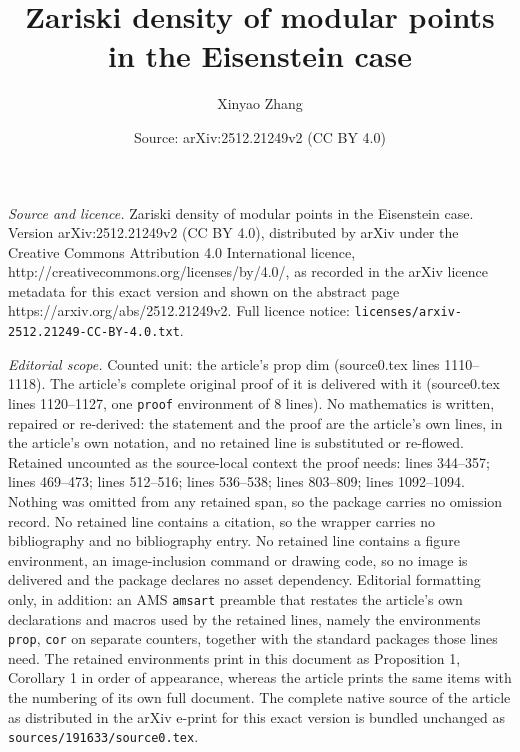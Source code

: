 \documentclass[10pt,a4paper]{amsart}
\title{Zariski density of modular points in the Eisenstein case}
\author{Xinyao Zhang}
\date{Source: arXiv:2512.21249v2 (CC BY 4.0)}
\begin{document}
\maketitle

\noindent\emph{Source and licence.} Zariski density of modular points in the Eisenstein case. Version arXiv:2512.21249v2 (CC BY 4.0), distributed by arXiv under the Creative Commons Attribution 4.0 International licence, http://creativecommons.org/licenses/by/4.0/, as recorded in the arXiv licence metadata for this exact version and shown on the abstract page https://arxiv.org/abs/2512.21249v2. Full licence notice: \texttt{licenses/arxiv-2512.21249-CC-BY-4.0.txt}.\par\smallskip

\noindent\textit{Editorial scope.} Counted unit: the article's prop dim (source0.tex lines 1110--1118). The article's complete original proof of it is delivered with it (source0.tex lines 1120--1127, one \texttt{proof} environment of 8 lines). No mathematics is written, repaired or re-derived: the statement and the proof are the article's own lines, in the article's own notation, and no retained line is substituted or re-flowed.  Retained uncounted as the source-local context the proof needs: lines 344--357; lines 469--473; lines 512--516; lines 536--538; lines 803--809; lines 1092--1094.  Nothing was omitted from any retained span, so the package carries no omission record.  No retained line contains a citation, so the wrapper carries no bibliography and no bibliography entry.  No retained line contains a figure environment, an image-inclusion command or drawing code, so no image is delivered and the package declares no asset dependency.  Editorial formatting only, in addition: an AMS \texttt{amsart} preamble that restates the article's own declarations and macros used by the retained lines, namely the environments \texttt{prop}, \texttt{cor} on separate counters, together with the standard packages those lines need.  The retained environments print in this document as Proposition 1, Corollary 1 in order of appearance, whereas the article prints the same items with the numbering of its own full document.  The complete native source of the article as distributed in the arXiv e-print for this exact version is bundled unchanged as \texttt{sources/191633/source0.tex}.
\end{document}
